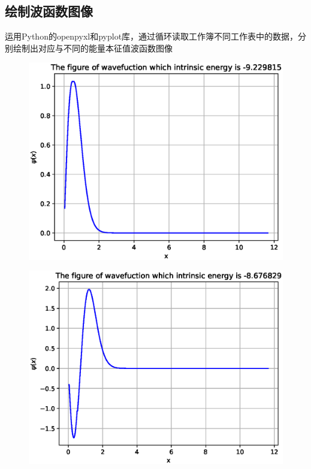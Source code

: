 \documentclass[twoside,twocolumn]{article}
\begin{document}
\begin{CJK*}{UTF8}{gkai}
\section{绘制波函数图像}
运用Python的openpyxl和pyplot库，通过循环读取工作簿不同工作表中的数据，分别绘制出对应与不同的能量本征值波函数图像
\begin{figure}[htb]
	\centering
	\includegraphics[width=0.98\linewidth]{figure/1}
	\label{fig:1}
\end{figure}
\begin{figure}[htb]
	\centering
	\includegraphics[width=0.98\linewidth]{figure/2}
	\label{fig:2}
\end{figure}
\begin{figure}[htb]

\end{figure}
\end{CJK*}
\end{document}
